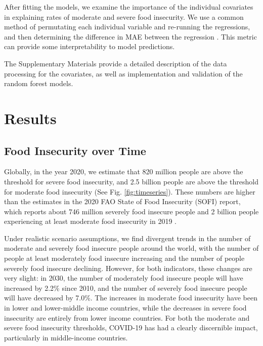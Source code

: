 \documentclass[titlepage]{article}
\begin{document}
After fitting the models, we examine the importance of the individual covariates in explaining rates of moderate and severe food insecurity. We use a common method of permutating each individual variable and re-running the regressions, and then determining the difference in MAE between the regression \citep{ishwaran2007variable, breiman2001random}.  This metric can provide some interpretability to model predictions.

The Supplementary Materials provide a detailed description of the data processing for the covariates, as well as implementation and validation of the random forest models.

\section{Results}
\subsection{Food Insecurity over Time}
Globally, in the year 2020, we estimate that 820 million people are above the threshold for severe food insecurity, and 2.5 billion people are above the threshold for moderate food insecurity (See Fig. \ref{fig:timeseries}). These numbers are higher than the estimates in the 2020 FAO State of Food Insecurity (SOFI) report, which reports about 746 million severely food insecure people and 2 billion people experiencing at least moderate food insecurity in 2019 \citep{sofi2020}. 

Under realistic scenario assumptions, we find divergent trends in the number of moderate and severely food insecure people around the world, with the number of people at least moderately food insecure increasing and the number of people severely food insecure declining.  However, for both indicators, these changes are very slight: in 2030, the number of moderately food insecure people will have increased by 2.2\% since 2010, and the number of severely food insecure people will have decreased by 7.0\%.  The increases in moderate food insecurity have been in lower and lower-middle income countries, while the decreases in severe food insecurity are entirely from lower income countries.  For both the moderate and severe food insecurity thresholds, COVID-19 has had a clearly discernible impact, particularly in middle-income countries.
\end{document}
